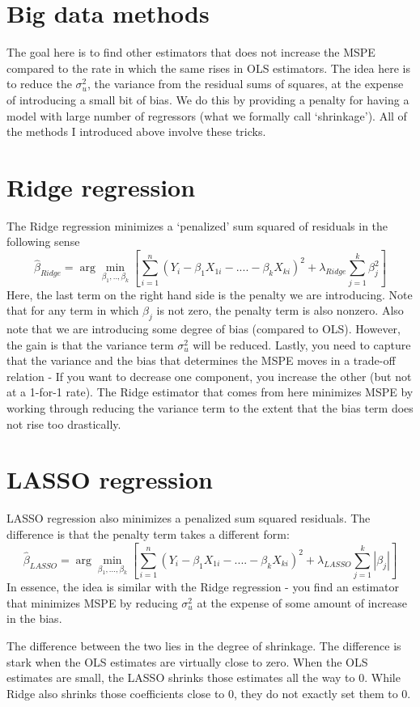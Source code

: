\section{Big data methods}
The goal here is to find other estimators that does not increase the MSPE compared to the rate in which the same rises in OLS estimators. The idea here is to reduce the $\sigma_u^2$, the variance from the residual sums of squares, at the expense of introducing a small bit of bias. We do this by providing a penalty for having a model with large number of regressors (what we formally call `shrinkage'). All of the methods I introduced above involve these tricks. 
\section{Ridge regression}
The Ridge regression minimizes a `penalized' sum squared of residuals in the following sense
\[
\hat{\beta}_{Ridge}=\arg\min_{\beta_1,..,\beta_k}\left[ \sum_{i=1}^n(Y_i - \beta_1X_{1i}-....-\beta_kX_{ki})^2 + \lambda_{Ridge}\sum_{j=1}^k\beta_j^2\right]
\]
Here, the last term on the right hand side is the penalty we are introducing. Note that for any term in which $\beta_j$ is not zero, the penalty term is also nonzero. Also note that we are introducing some degree of bias (compared to OLS). However, the gain is that the variance term $\sigma_u^2$ will be reduced. Lastly, you need to capture that the variance and the bias that determines the MSPE moves in a trade-off relation - If you want to decrease one component, you increase the other (but not at a 1-for-1 rate). The Ridge estimator that comes from here minimizes MSPE by working through reducing the variance term to the extent that the bias term does not rise too drastically. 

\section{LASSO regression}
LASSO regression also minimizes a penalized sum squared residuals. The difference is that the penalty term takes a different form: 
\[
\hat{\beta}_{LASSO}=\arg\min_{\beta_1,...,\beta_k}\left[ \sum_{i=1}^n(Y_i - \beta_1X_{1i}-....-\beta_kX_{ki})^2 + \lambda_{LASSO}\sum_{j=1}^k |\beta_j|\right]
\]
In essence, the idea is similar with the Ridge regression - you find an estimator that minimizes MSPE by reducing $\sigma_u^2$ at the expense of some amount of increase in the bias. 
\par\medskip
The difference between the two lies in the degree of shrinkage. The difference is stark when the OLS estimates are virtually close to zero. When the OLS estimates are small, the LASSO shrinks those estimates all the way to 0. While Ridge also shrinks those coefficients close to 0, they do not exactly set them to 0. 
